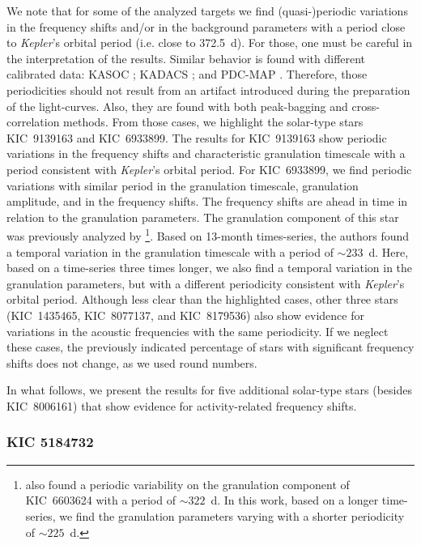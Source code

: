 \documentclass[twocolumn]{aastex61}%
\begin{document}
We note that for some of the analyzed targets we find (quasi-)periodic variations in the frequency shifts and/or in the background parameters with a period close to {\it Kepler}'s orbital period (i.e. close to 372.5~d). For those, one must be careful in the interpretation of the results. Similar behavior is found with different calibrated data: KASOC \citep{Handberg2014}; KADACS \citep{Garcia2011}; and PDC-MAP \citep[Presearch Data Conditioning - Maximum A Posteriori;][]{Stumpe2012,Smith2012}. Therefore, those periodicities should not result from an artifact introduced during the preparation of the light-curves. Also, they are found with both peak-bagging and cross-correlation methods. From those cases, we highlight the solar-type stars KIC~9139163 and KIC~6933899. The results for KIC~9139163 show periodic variations in the frequency shifts and characteristic granulation timescale with a period consistent with {\it Kepler}'s orbital period. For KIC~6933899, we find periodic variations with similar period in the granulation timescale, granulation amplitude, and in the frequency shifts. The frequency shifts are ahead in time in relation to the granulation parameters. The granulation component of this star was previously analyzed by \citet{Karoff2013}\footnote{\citet{Karoff2013} also found a periodic variability on the granulation component of KIC~6603624 with a period of $\sim322$~d. In this work, based on a longer time-series, we find the granulation parameters varying with a shorter periodicity of $\sim225$~d.}. Based on 13-month times-series, the authors found a temporal variation in  the granulation timescale with a period of $\sim233$~d. Here, based on a time-series three times longer, we also find a temporal variation in the granulation parameters, but with a different periodicity consistent with {\it Kepler}'s orbital period. Although less clear than the highlighted cases, other three stars (KIC~1435465, KIC~8077137, and KIC~8179536) also show evidence for variations in the acoustic frequencies with the same periodicity. If we neglect these cases, the previously indicated percentage of stars with significant frequency shifts does not change, as we used round numbers.

In what follows, we present the results for five additional solar-type stars (besides KIC~8006161) that show evidence for activity-related frequency shifts.

\subsubsection{KIC 5184732}
\end{document}
